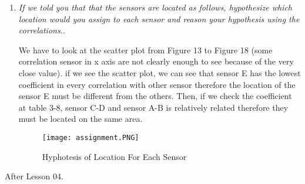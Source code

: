 \documentclass[a4paper,12pt]{article} %
\begin{document}
\begin{enumerate}
\item {\it If we told you that that the sensors are located as follows, hypothesize which location would you assign to each sensor and reason your hypothesis using the correlations.}. %
	
We have to look at the scatter plot from Figure 13 to Figure 18 (some correlation sensor in x axis are not clearly enough to see because of the very close value). if we see the scatter plot, we can see that sensor E has the lowest coefficient in every correlation with other sensor therefore the location of the sensor E must be different from the others. Then, if we check the coefficient at table 3-8, sensor C-D and sensor A-B is relatively related therefore they must be located on the same area. 

\begin{figure}[H]
    \centering
    \texttt{[image: assignment.PNG]}
    \caption{Hyphotesis of Location For Each Sensor}
    \label{fig:my_label}
\end{figure}

\end{enumerate}

\begin{flushleft}
\Large{After Lesson 04.}
\end{flushleft}
\end{document}
